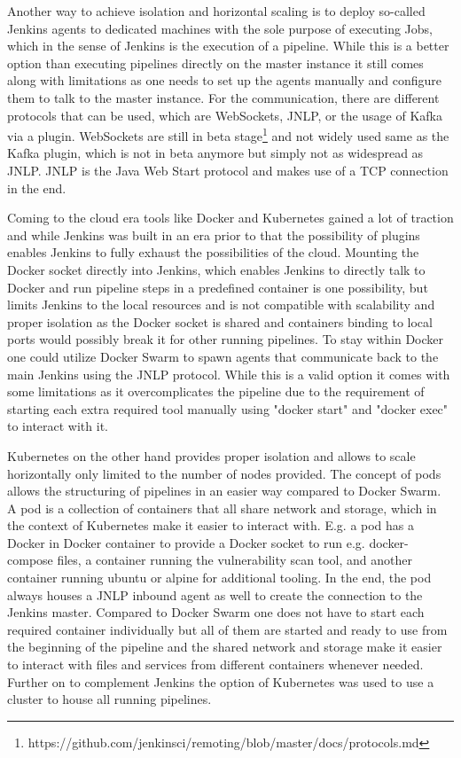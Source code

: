 Another way to achieve isolation and horizontal scaling is to deploy so-called Jenkins agents to dedicated machines with the sole purpose of executing Jobs, which in the sense of Jenkins is the execution of a pipeline. While this is a better option than executing pipelines directly on the master instance it still comes along with limitations as one needs to set up the agents manually and configure them to talk to the master instance. For the communication, there are different protocols that can be used, which are WebSockets, JNLP, or the usage of Kafka via a plugin. WebSockets are still in beta stage\footnote{https://github.com/jenkinsci/remoting/blob/master/docs/protocols.md} and not widely used same as the Kafka plugin, which is not in beta anymore but simply not as widespread as JNLP. JNLP is the Java Web Start protocol and makes use of a TCP connection in the end.

Coming to the cloud era tools like Docker and Kubernetes gained a lot of traction and while Jenkins was built in an era prior to that the possibility of plugins enables Jenkins to fully exhaust the possibilities of the cloud.
Mounting the Docker socket directly into Jenkins, which enables Jenkins to directly talk to Docker and run pipeline steps in a predefined container is one possibility, but limits Jenkins to the local resources and is not compatible with scalability and proper isolation as the Docker socket is shared and containers binding to local ports would possibly break it for other running pipelines. To stay within Docker one could utilize Docker Swarm to spawn agents that communicate back to the main Jenkins using the JNLP protocol. While this is a valid option it comes with some limitations as it overcomplicates the pipeline due to the requirement of starting each extra required tool manually using "docker start" and "docker exec" to interact with it.

Kubernetes on the other hand provides proper isolation and allows to scale horizontally only limited to the number of nodes provided. The concept of pods allows the structuring of pipelines in an easier way compared to Docker Swarm. A pod is a collection of containers that all share network and storage, which in the context of Kubernetes make it easier to interact with. E.g. a pod has a Docker in Docker container to provide a Docker socket to run e.g. docker-compose files, a container running the vulnerability scan tool, and another container running ubuntu or alpine for additional tooling. In the end, the pod always houses a JNLP inbound agent as well to create the connection to the Jenkins master. Compared to Docker Swarm one does not have to start each required container individually but all of them are started and ready to use from the beginning of the pipeline and the shared network and storage make it easier to interact with files and services from different containers whenever needed.
Further on to complement Jenkins the option of Kubernetes was used to use a cluster to house all running pipelines.

